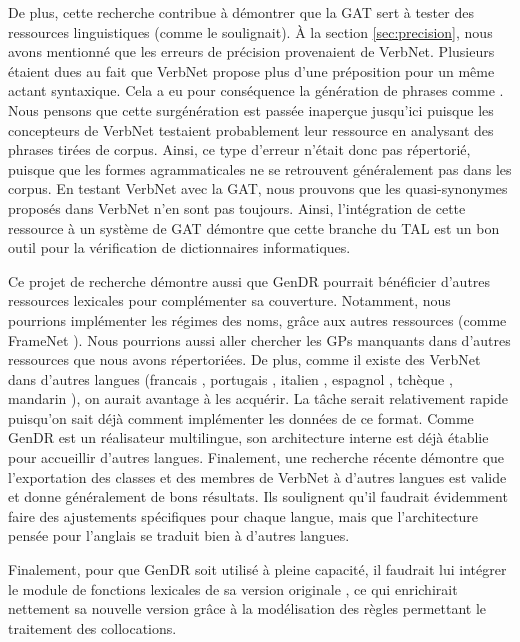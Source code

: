 De plus, cette recherche contribue à démontrer que la \ac{GAT} sert à tester des ressources linguistiques (comme \cite{DanlosPresentationmodelegeneration1983} le soulignait). À la section \ref{sec:precision}, nous avons mentionné que les erreurs de précision provenaient de VerbNet. Plusieurs étaient dues au fait que VerbNet propose plus d'une préposition pour un même actant syntaxique. Cela a eu pour conséquence la génération de phrases comme \ungr{}. Nous pensons que cette surgénération est passée inaperçue jusqu'ici puisque les concepteurs de VerbNet testaient probablement leur ressource en analysant des phrases tirées de corpus. Ainsi, ce type d'erreur n'était donc pas répertorié, puisque que les formes agrammaticales ne se retrouvent généralement pas dans les corpus. En testant VerbNet avec la \ac{GAT}, nous prouvons que les quasi-synonymes proposés dans VerbNet n'en sont pas toujours. Ainsi, l'intégration de cette ressource à un système de \ac{GAT} démontre que cette branche du \ac{TAL} est un bon outil pour la vérification de dictionnaires informatiques.

Ce projet de recherche démontre aussi que GenDR pourrait bénéficier d'autres ressources lexicales pour complémenter sa couverture. Notamment, nous pourrions implémenter les régimes des noms, grâce aux autres ressources (comme FrameNet \cite{FillmoreBackgroundFramenet2003a}). Nous pourrions aussi aller chercher les \acp{GP} manquants dans d'autres ressources que nous avons répertoriées. De plus, comme il existe des VerbNet dans d'autres langues (francais \citep{danlos:hal-01179175}, portugais \citep{ScartoncrosslinguisticVerbNetstylelexicon2012}, italien \citep{busso2016italian}, espagnol \citep{TauleAnCoraNetMappingSpanish2010}, tchèque \citep{pala2008can}, mandarin \citep{liu2008construction}), on aurait avantage à les acquérir. La tâche serait relativement rapide puisqu'on sait déjà comment implémenter les données de ce format. Comme GenDR est un réalisateur multilingue, son architecture interne est déjà établie pour accueillir d'autres langues. Finalement, une recherche récente \citep{Majewska2017} démontre que l'exportation des classes et des membres de VerbNet \citep{SchulerVerbnetBroadcoverageComprehensive2005} à d'autres langues est valide et donne généralement de bons résultats. Ils soulignent qu'il faudrait évidemment faire des ajustements spécifiques pour chaque langue, mais que l'architecture pensée pour l'anglais se traduit bien à d'autres langues. 

Finalement, pour que GenDR soit utilisé à pleine capacité, il faudrait lui intégrer le module de fonctions lexicales de sa version originale \citep{LambreyImplementationcollocationspour2017, lareau18}, ce qui enrichirait nettement sa nouvelle version grâce à la modélisation des règles permettant le traitement des collocations.